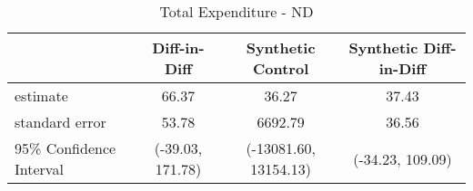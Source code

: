 \begin{table}[ht]
\centering
\begin{tabular}{lccc}
  \hline
 & Diff-in-Diff & Synthetic Control & Synthetic Diff-in-Diff \\ 
  \hline
estimate & 66.37 & 36.27 & 37.43 \\ 
  standard error & 53.78 & 6692.79 & 36.56 \\ 
  95\% Confidence Interval & (-39.03, 171.78) & (-13081.60, 13154.13) & (-34.23, 109.09) \\ 
   \hline
\end{tabular}
\caption{Total Expenditure - ND} 
\end{table}
